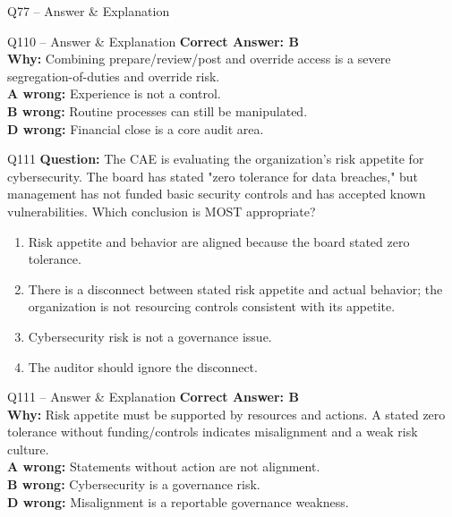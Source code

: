 \documentclass[aspectratio=169,10pt]{beamer}
\begin{document}
\begin{frame}[t]{Q77 -- Answer \& Explanation}
	\begin{frame}[t]{Q110 -- Answer \& Explanation}
		\small
		\textbf{Correct Answer: B} \\[4pt]
		\textbf{Why:} Combining prepare/review/post and override access is a severe segregation-of-duties and override risk. \\[4pt]
		\textbf{A wrong:} Experience is not a control. \\[2pt]
		\textbf{B wrong:} Routine processes can still be manipulated. \\[2pt]
		\textbf{D wrong:} Financial close is a core audit area.
	\end{frame}
	
	\begin{frame}[t]{Q111}
		\small
		\textbf{Question:} The CAE is evaluating the organization's risk appetite for cybersecurity. The board has stated "zero tolerance for data breaches," but management has not funded basic security controls and has accepted known vulnerabilities. Which conclusion is MOST appropriate?
		\begin{enumerate}[label=\Alph*.,itemsep=1pt,topsep=2pt]
			\item Risk appetite and behavior are aligned because the board stated zero tolerance.
			\item There is a disconnect between stated risk appetite and actual behavior; the organization is not resourcing controls consistent with its appetite.
			\item Cybersecurity risk is not a governance issue.
			\item The auditor should ignore the disconnect.
		\end{enumerate}
	\end{frame}
	
	\begin{frame}[t]{Q111 -- Answer \& Explanation}
		\small
		\textbf{Correct Answer: B} \\[4pt]
		\textbf{Why:} Risk appetite must be supported by resources and actions. A stated zero tolerance without funding/controls indicates misalignment and a weak risk culture. \\[4pt]
		\textbf{A wrong:} Statements without action are not alignment. \\[2pt]
		\textbf{B wrong:} Cybersecurity is a governance risk. \\[2pt]
		\textbf{D wrong:} Misalignment is a reportable governance weakness.
	\end{frame}
	

\end{frame}
\end{document}
